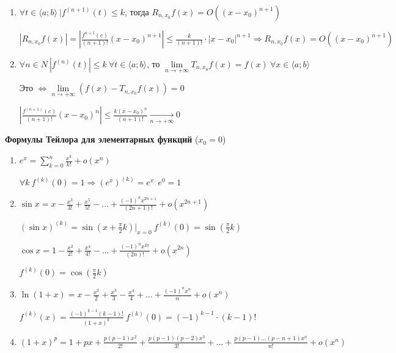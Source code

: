\documentclass[14pt, letter paper]{article}
\newcommand{\q}[1]{\langle #1 \rangle}
\begin{document}
\begin{enumerate}
    \item $\forall t \in \q{a; b}\ |f^{(n+1)}(t) \leq k$, тогда $R_{n, x_0}f(x) = O((x - x_0)^{n + 1})$
    
    $|R_{n, x_0}f(x)| = |\frac{f^{n + 1}(c)}{(n + 1)!}(x - x_0)^{n + 1}| \leq \frac{k}{(n + 1)!} \cdot |x - x_0|^{n + 1} \Rightarrow R_{n, x_0} f(x) = O((x - x_0)^{n + 1})$

    \item $\forall n \in N\ |f^{(n)}(t)| \leq k\ \forall t \in \q{a; b}$, то $\lim\limits_{n \rightarrow + \infty} T_{n, x_0}f(x) = f(x)\ \forall x \in \q{a; b}$
    
    Это $\Leftrightarrow \lim\limits_{n \rightarrow + \infty} (f(x) - T_{n, x_0}f(x)) = 0$

    $|\frac{f^{(n + 1)}(c)}{(n + 1)!}(x - x_0)^n| \leq \frac{k(x - x_0)^n}{(n + 1)!} \xrightarrow[n \rightarrow + \infty]{} 0$
\end{enumerate}

\textbf{Формулы Тейлора для элементарных функций} ($x_0 = 0$)

\begin{enumerate}
    \item $e^x = \sum\limits_{k = 0}^n \frac{x^k}{k!} + o(x^n)$
    
    $\forall k\ f^{(k)}(0) = 1 \Rightarrow (e^x)^{(k)} = e^x\ \ e^0 = 1$

    \item $\sin{x} = x - \frac{x^3}{3!} + \frac{x^5}{5!} - \ldots + \frac{(-1)^n x^{2n + 1}}{(2n + 1)!} + o(x^{2n + 1})$
    
    $(\sin{x})^{(k)} = \sin{(x + \frac{\pi}{2}k)}|_{x = 0}\ f^{(k)}(0) = \sin{(\frac{\pi}{2}k)}$

    $\cos{x} = 1 - \frac{x^2}{2!} + \frac{x^4}{4!} - \ldots + \frac{(-1)^n x^{2n}}{(2n)!} + o(x^{2n})$
    
    $f^{(k)}(0) = \cos{(\frac{\pi}{2}k)}$

    \item $\ln{(1 + x)} = x - \frac{x^2}{2} + \frac{x^3}{3} - \frac{x^4}{4} + \ldots + \frac{(-1)^nx^n}{n} + o(x^n)$
    
    $f^{(k)}(x) = \frac{(-1)^{k - 1}(k - 1)!}{(1 + x)^k}\ f^{(k)}(0) = (-1)^{k - 1} \cdot (k - 1)!$

    \item $(1 + x)^p = 1 + px + \frac{p(p-1)x^2}{2!} + \frac{p(p-1)(p-2)x^3}{3!} + \ldots + \frac{p(p-1)\ldots(p-n+1)x^n}{n!} + o(x^n)$
\end{enumerate}
\end{document}
